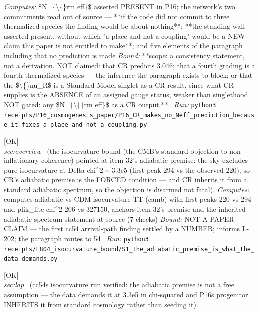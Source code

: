 \begin{description}
\emph{Computes:} \$N\_\{\textbackslash\{\}rm eff\}\$ asserted PRESENT in P16; the network's two commitments read out of source --- **if the code did not commit to three thermalized species the finding would be about nothing**; **the standing wall asserted present, without which "a place and not a coupling" would be a NEW claim this paper is not entitled to make**; and five elements of the paragraph including that no prediction is made
 \emph{Bound:} **scope: a consistency statement, not a derivation. NOT claimed: that CR predicts 3.046; that a fourth grading is a fourth thermalized species --- the inference the paragraph exists to block; or that the \$\textbackslash\{\}nu\_R\$ is a Standard Model singlet as a CR result, since what CR supplies is the ABSENCE of an assigned gauge status, weaker than singlethood. NOT gated: any \$N\_\{\textbackslash\{\}rm eff\}\$ as a CR output.**
\ \emph{Run:} \texttt{python3 receipts/P16\_cosmogenesis\_paper/P16\_CR\_makes\_no\_Neff\_prediction\_because\_it\_fixes\_a\_place\_and\_not\_a\_coupling.py}
\item[\label{rcpt:S1_the_adiabatic_premise_is_what_the_data_demands}\textbf{}\quad\texttt{S1\_the\_adiabatic\_premise\_is\_what\_the\_data\_demands}]\hfill\textsf{[OK]}\\
\textit{sec:overview} \ (the isocurvature bound (the CMB's standard objection to non-inflationary coherence) pointed at item 32's adiabatic premise: the sky excludes pure isocurvature at Delta chi\textasciicircum{}2 \textasciitilde{} 3.3e5 (first peak 294 vs the observed 220), so CR's adiabatic premise is the FORCED condition --- and CR inherits it from a standard adiabatic spectrum, so the objection is disarmed not fatal). 
\emph{Computes:} computes adiabatic vs CDM-isocurvature TT (camb) with first peaks 220 vs 294 and plik\_lite chi\textasciicircum{}2 206 vs 327150, anchors item 32's premise and the inherited-adiabatic-spectrum statement at source (7 checks)
 \emph{Bound:} NOT-A-PAPER-CLAIM --- the first cc54 arrival-path finding settled by a NUMBER; informs L-202; the paragraph routes to 54
\ \emph{Run:} \texttt{python3 receipts/L804\_isocurvature\_bound/S1\_the\_adiabatic\_premise\_is\_what\_the\_data\_demands.py}
\item[\label{rcpt:P12_the_adiabatic_premise_is_inherited_not_assumed}\textbf{}\quad\texttt{P12\_the\_adiabatic\_premise\_is\_inherited\_not\_assumed}]\hfill\textsf{[OK]}\\
\textit{sec:lap} \ (cc54s isocurvature run verified: the adiabatic premise is not a free assumption --- the data demands it at 3.3e5 in chi-squared and P16s progenitor INHERITS it from standard cosmology rather than seeding it). 

\end{description}
